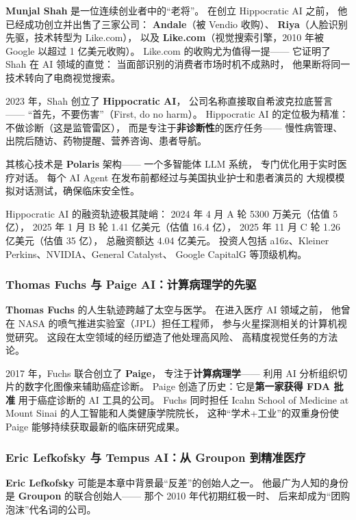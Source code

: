\textbf{Munjal Shah} 是一位连续创业者中的``老将''。
在创立 Hippocratic AI 之前，
他已经成功创立并出售了三家公司：
\textbf{Andale}（被 Vendio 收购）、
\textbf{Riya}（人脸识别先驱，技术转型为 Like.com），
以及 \textbf{Like.com}（视觉搜索引擎，2010 年被 Google 以超过 1 亿美元收购）。
Like.com 的收购尤为值得一提——
它证明了 Shah 在 AI 领域的直觉：
当面部识别的消费者市场时机不成熟时，
他果断将同一技术转向了电商视觉搜索。

2023 年，Shah 创立了 \textbf{Hippocratic AI}，
公司名称直接取自希波克拉底誓言——
``首先，不要伤害''（First, do no harm）。
Hippocratic AI 的定位极为精准：
不做诊断（这是监管雷区），
而是专注于\textbf{非诊断性}的医疗任务——
慢性病管理、出院后随访、药物提醒、营养咨询、患者导航。

其核心技术是 \textbf{Polaris} 架构——
一个多智能体 LLM 系统，
专门优化用于实时医疗对话。
每个 AI Agent 在发布前都经过与美国执业护士和患者演员的
大规模模拟对话测试，确保临床安全性。

Hippocratic AI 的融资轨迹极其陡峭：
2024 年 4 月 A 轮 5300 万美元（估值 5 亿），
2025 年 1 月 B 轮 1.41 亿美元（估值 16.4 亿），
2025 年 11 月 C 轮 1.26 亿美元（估值 35 亿），
总融资额达 4.04 亿美元。
投资人包括 a16z、Kleiner Perkins、NVIDIA、General Catalyst、
Google CapitalG 等顶级机构。

\subsubsection{Thomas Fuchs 与 Paige AI：计算病理学的先驱}

\textbf{Thomas Fuchs} 的人生轨迹跨越了太空与医学。
在进入医疗 AI 领域之前，
他曾在 NASA 的喷气推进实验室（JPL）担任工程师，
参与火星探测相关的计算机视觉研究。
这段在太空领域的经历塑造了他处理高风险、
高精度视觉任务的方法论。

2017 年，Fuchs 联合创立了 \textbf{Paige}，
专注于\textbf{计算病理学}——
利用 AI 分析组织切片的数字化图像来辅助癌症诊断。
Paige 创造了历史：它是\textbf{第一家获得 FDA 批准}
用于癌症诊断的 AI 工具的公司。
Fuchs 同时担任 Icahn School of Medicine at Mount Sinai
的人工智能和人类健康学院院长，
这种``学术+工业''的双重身份使 Paige
能够持续获取最新的临床研究成果。

\subsubsection{Eric Lefkofsky 与 Tempus AI：从 Groupon 到精准医疗}

\textbf{Eric Lefkofsky} 可能是本章中背景最``反差''的创始人之一。
他最广为人知的身份是 \textbf{Groupon} 的联合创始人——
那个 2010 年代初期红极一时、
后来却成为``团购泡沫''代名词的公司。

